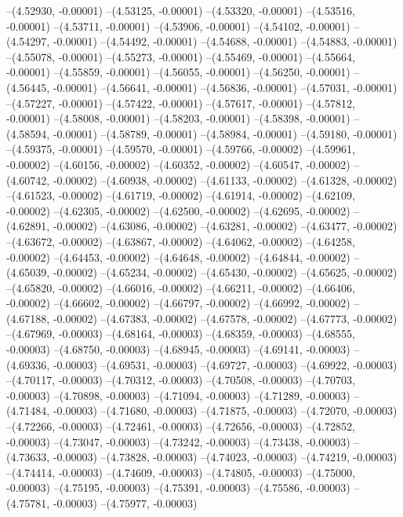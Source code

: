 --(4.52930, -0.00001)
--(4.53125, -0.00001)
--(4.53320, -0.00001)
--(4.53516, -0.00001)
--(4.53711, -0.00001)
--(4.53906, -0.00001)
--(4.54102, -0.00001)
--(4.54297, -0.00001)
--(4.54492, -0.00001)
--(4.54688, -0.00001)
--(4.54883, -0.00001)
--(4.55078, -0.00001)
--(4.55273, -0.00001)
--(4.55469, -0.00001)
--(4.55664, -0.00001)
--(4.55859, -0.00001)
--(4.56055, -0.00001)
--(4.56250, -0.00001)
--(4.56445, -0.00001)
--(4.56641, -0.00001)
--(4.56836, -0.00001)
--(4.57031, -0.00001)
--(4.57227, -0.00001)
--(4.57422, -0.00001)
--(4.57617, -0.00001)
--(4.57812, -0.00001)
--(4.58008, -0.00001)
--(4.58203, -0.00001)
--(4.58398, -0.00001)
--(4.58594, -0.00001)
--(4.58789, -0.00001)
--(4.58984, -0.00001)
--(4.59180, -0.00001)
--(4.59375, -0.00001)
--(4.59570, -0.00001)
--(4.59766, -0.00002)
--(4.59961, -0.00002)
--(4.60156, -0.00002)
--(4.60352, -0.00002)
--(4.60547, -0.00002)
--(4.60742, -0.00002)
--(4.60938, -0.00002)
--(4.61133, -0.00002)
--(4.61328, -0.00002)
--(4.61523, -0.00002)
--(4.61719, -0.00002)
--(4.61914, -0.00002)
--(4.62109, -0.00002)
--(4.62305, -0.00002)
--(4.62500, -0.00002)
--(4.62695, -0.00002)
--(4.62891, -0.00002)
--(4.63086, -0.00002)
--(4.63281, -0.00002)
--(4.63477, -0.00002)
--(4.63672, -0.00002)
--(4.63867, -0.00002)
--(4.64062, -0.00002)
--(4.64258, -0.00002)
--(4.64453, -0.00002)
--(4.64648, -0.00002)
--(4.64844, -0.00002)
--(4.65039, -0.00002)
--(4.65234, -0.00002)
--(4.65430, -0.00002)
--(4.65625, -0.00002)
--(4.65820, -0.00002)
--(4.66016, -0.00002)
--(4.66211, -0.00002)
--(4.66406, -0.00002)
--(4.66602, -0.00002)
--(4.66797, -0.00002)
--(4.66992, -0.00002)
--(4.67188, -0.00002)
--(4.67383, -0.00002)
--(4.67578, -0.00002)
--(4.67773, -0.00002)
--(4.67969, -0.00003)
--(4.68164, -0.00003)
--(4.68359, -0.00003)
--(4.68555, -0.00003)
--(4.68750, -0.00003)
--(4.68945, -0.00003)
--(4.69141, -0.00003)
--(4.69336, -0.00003)
--(4.69531, -0.00003)
--(4.69727, -0.00003)
--(4.69922, -0.00003)
--(4.70117, -0.00003)
--(4.70312, -0.00003)
--(4.70508, -0.00003)
--(4.70703, -0.00003)
--(4.70898, -0.00003)
--(4.71094, -0.00003)
--(4.71289, -0.00003)
--(4.71484, -0.00003)
--(4.71680, -0.00003)
--(4.71875, -0.00003)
--(4.72070, -0.00003)
--(4.72266, -0.00003)
--(4.72461, -0.00003)
--(4.72656, -0.00003)
--(4.72852, -0.00003)
--(4.73047, -0.00003)
--(4.73242, -0.00003)
--(4.73438, -0.00003)
--(4.73633, -0.00003)
--(4.73828, -0.00003)
--(4.74023, -0.00003)
--(4.74219, -0.00003)
--(4.74414, -0.00003)
--(4.74609, -0.00003)
--(4.74805, -0.00003)
--(4.75000, -0.00003)
--(4.75195, -0.00003)
--(4.75391, -0.00003)
--(4.75586, -0.00003)
--(4.75781, -0.00003)
--(4.75977, -0.00003)
